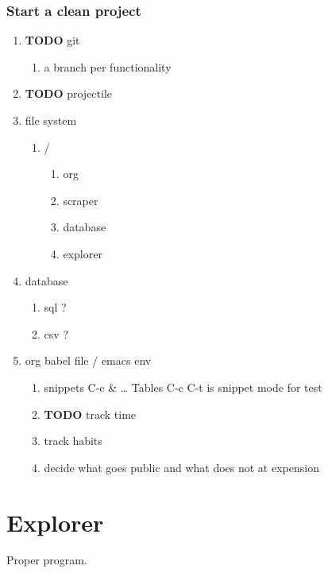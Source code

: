\documentclass[11pt]{article}
\begin{document}
\subsubsection{Start a clean project}
\label{sec:org86742d7}
\begin{enumerate}
\item {\bfseries\sffamily TODO} git
\label{sec:org147e883}
\begin{enumerate}
\item a branch per functionality
\label{sec:orgac0617f}
\end{enumerate}
\item {\bfseries\sffamily TODO} projectile
\label{sec:orgd7334e1}
\item file system
\label{sec:orgdd2e52b}
\begin{enumerate}
\item /
\label{sec:org1e04d31}
\begin{enumerate}
\item org
\label{sec:orgfbd2fbd}
\item scraper
\label{sec:org9055bbe}
\item database
\label{sec:org20fe3ac}
\item explorer
\label{sec:orgd82c465}
\end{enumerate}
\end{enumerate}
\item database
\label{sec:org9131b6d}
\begin{enumerate}
\item sql ?
\label{sec:org1cb5daf}
\item csv ?
\label{sec:org1207c4f}
\end{enumerate}
\item org babel file / emacs env
\label{sec:org83e3ae9}
\begin{enumerate}
\item snippets
\label{sec:org5c9eabc}
C-c \& \ldots{}
Tables
C-c C-t is snippet mode for test
\item {\bfseries\sffamily TODO} track time
\label{sec:org9f28b7c}
\item track habits
\label{sec:orgc20b7fe}
\item decide what goes public and what does not at expension
\label{sec:org7818e04}
\end{enumerate}
\end{enumerate}
\section{Explorer}
\label{sec:org2ce1699}
Proper program.
\end{document}

